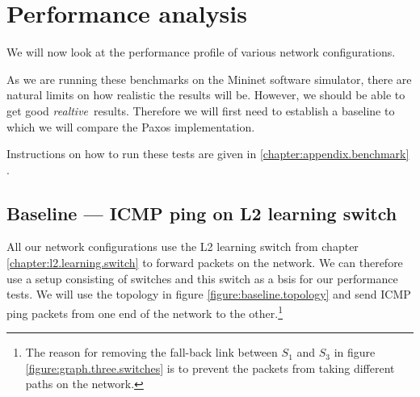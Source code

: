 \chapter{Performance analysis}
\label{chapter:analysis}

We will now look at the performance profile of various network
configurations.

As we are running these benchmarks on the Mininet software simulator, there
are natural limits on how realistic the results will be.  However, we should
be able to get good \textit{realtive} results.   Therefore we will first
need to establish a baseline to which we will compare the Paxos
implementation.

Instructions on how to run these tests are given in
\ref{chapter:appendix.benchmark} .

\section{Baseline --- ICMP ping on L2 learning switch}
\label{chapter:baseline.benchmark}

All our network configurations use the L2 learning switch from chapter
\ref{chapter:l2.learning.switch} to forward packets on the network.  We can
therefore use a setup consisting of switches and this switch as a bsis for
our performance tests.  We will use the topology in figure
\ref{figure:baseline.topology} and send ICMP ping packets from one end of
the network to the other.\footnote{
The reason for removing the fall-back link between $S_1$ and $S_3$ in figure
\ref{figure:graph.three.switches} is to prevent the packets from taking
different paths on the network.}

